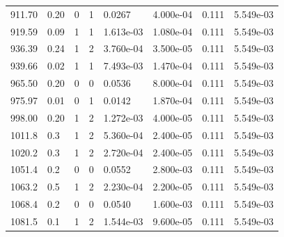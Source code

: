 \documentclass[preview]{standalone}
\begin{document}
{{{\begin{tabular}{L{1.2cm}C{1.2cm} C{0.3cm}C{0.5cm} C{1.4cm}C{1.4cm} C{1.4cm}C{1.4cm}}
  911.70  &  0.20  & 0     &  1 &  0.0267  & 4.000e-04  & 0.111 &  5.549e-03   \\ 
  919.59  &  0.09  & 1     &  1 &  1.613e-03  & 1.080e-04  & 0.111 &  5.549e-03   \\ 
  936.39  &  0.24  & 1     &  2 &  3.760e-04  & 3.500e-05  & 0.111 &  5.549e-03   \\ 
  939.66  &  0.02  & 1     &  1 &  7.493e-03  & 1.470e-04  & 0.111 &  5.549e-03   \\ 
  965.50  &  0.20  & 0     &  0 &  0.0536  & 8.000e-04  & 0.111 &  5.549e-03   \\ 
  975.97  &  0.01  & 0     &  1 &  0.0142  & 1.870e-04  & 0.111 &  5.549e-03   \\ 
  998.00  &  0.20  & 1     &  2 &  1.272e-03  & 4.000e-05  & 0.111 &  5.549e-03   \\ 
  1011.8  &   0.3  & 1     &  2 &  5.360e-04  & 2.400e-05  & 0.111 &  5.549e-03   \\ 
  1020.2  &   0.3  & 1     &  2 &  2.720e-04  & 2.400e-05  & 0.111 &  5.549e-03   \\ 
  1051.4  &   0.2  & 0     &  0 &  0.0552  & 2.800e-03  & 0.111 &  5.549e-03   \\ 
  1063.2  &   0.5  & 1     &  2 &  2.230e-04  & 2.200e-05  & 0.111 &  5.549e-03   \\ 
  1068.4  &   0.2  & 0     &  0 &  0.0540  & 1.600e-03  & 0.111 &  5.549e-03   \\ 
  1081.5  &   0.1  & 1     &  2 &  1.544e-03  & 9.600e-05  & 0.111 &  5.549e-03   \\ 
\hline 
\end{tabular} 

}}}
\end{document}
